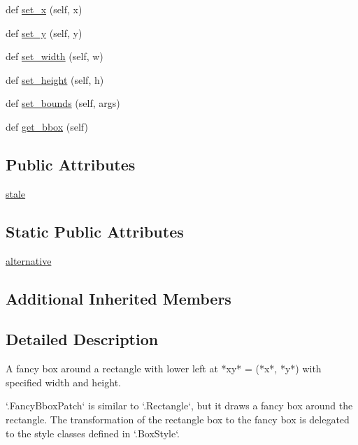 \begin{DoxyCompactItemize}
\item 
def \hyperlink{classmatplotlib_1_1patches_1_1FancyBboxPatch_a189b7369381e7f27133f83c6647bc958}{set\+\_\+x} (self, x)
\item 
def \hyperlink{classmatplotlib_1_1patches_1_1FancyBboxPatch_a599aa8b30f79df1332cc30ac4d9f686a}{set\+\_\+y} (self, y)
\item 
def \hyperlink{classmatplotlib_1_1patches_1_1FancyBboxPatch_afd5f42c60bdae3df3da5730a33db90af}{set\+\_\+width} (self, w)
\item 
def \hyperlink{classmatplotlib_1_1patches_1_1FancyBboxPatch_a0d147b5a2822fa08d7a17d9da0148a1e}{set\+\_\+height} (self, h)
\item 
def \hyperlink{classmatplotlib_1_1patches_1_1FancyBboxPatch_af33f956f6302111810c2a70cd3c56f0b}{set\+\_\+bounds} (self, args)
\item 
def \hyperlink{classmatplotlib_1_1patches_1_1FancyBboxPatch_a2ef4885a35222feec159ce397b28c85a}{get\+\_\+bbox} (self)
\end{DoxyCompactItemize}
\subsection*{Public Attributes}
\begin{DoxyCompactItemize}
\item 
\hyperlink{classmatplotlib_1_1patches_1_1FancyBboxPatch_aff4895e8d6af5088574480409b77c716}{stale}
\end{DoxyCompactItemize}
\subsection*{Static Public Attributes}
\begin{DoxyCompactItemize}
\item 
\hyperlink{classmatplotlib_1_1patches_1_1FancyBboxPatch_a235f4b92037acb36688ec133aa97a7bf}{alternative}
\end{DoxyCompactItemize}
\subsection*{Additional Inherited Members}


\subsection{Detailed Description}
\begin{DoxyVerb}A fancy box around a rectangle with lower left at *xy* = (*x*, *y*)
with specified width and height.

`.FancyBboxPatch` is similar to `.Rectangle`, but it draws a fancy box
around the rectangle. The transformation of the rectangle box to the
fancy box is delegated to the style classes defined in `.BoxStyle`.
\end{DoxyVerb}
 

